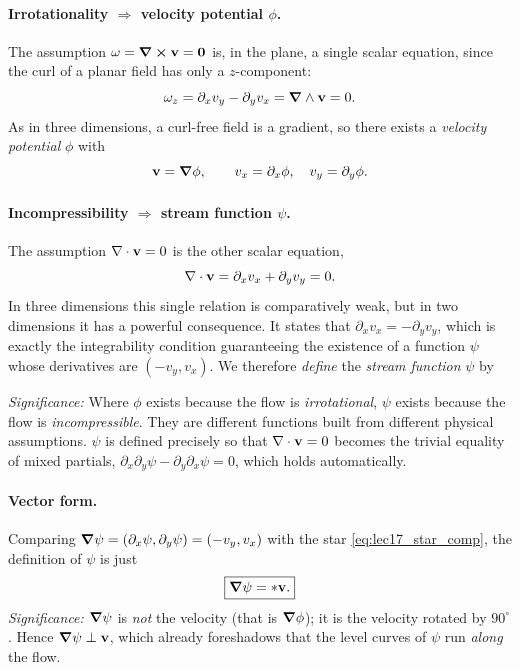 \documentclass[../main.tex]{subfiles}
\begin{document}
\paragraph{Irrotationality $\Rightarrow$ velocity potential $\phi$.}
The assumption $\mathbf{\omega}=\curl\mathbf{v}=\mathbf{0}$ is, in the plane, a single scalar equation, since the curl of a planar field has only a $z$-component:
\begin{equation}
  \omega_z=\partial_x v_y-\partial_y v_x = \grad\wedge\mathbf{v} = 0.
  \label{eq:lec17_irrot}
\end{equation}
As in three dimensions, a curl-free field is a gradient, so there exists a \emph{velocity potential} $\phi$ with
\begin{equation}
  \mathbf{v}=\grad\phi,\qquad v_x=\partial_x\phi,\quad v_y=\partial_y\phi.
  \label{eq:lec17_velpot}
\end{equation}

\paragraph{Incompressibility $\Rightarrow$ stream function $\psi$.}
The assumption $\nabla \cdot\mathbf{v}=0$ is the other scalar equation,
\begin{equation}
  \nabla \cdot\mathbf{v} = \partial_x v_x+\partial_y v_y = 0.
  \label{eq:lec17_incomp}
\end{equation}
In three dimensions this single relation is comparatively weak, but in two dimensions it has a powerful consequence. It states that $\partial_x v_x=-\partial_y v_y$, which is exactly the integrability condition guaranteeing the existence of a function $\psi$ whose derivatives are $(-v_y,v_x)$. We therefore \emph{define} the \emph{stream function} $\psi$ by

\textit{Significance:} Where $\phi$ exists because the flow is \emph{irrotational}, $\psi$ exists because the flow is \emph{incompressible}. They are different functions built from different physical assumptions. $\psi$ is defined precisely so that $\nabla \cdot\mathbf{v}=0$ becomes the trivial equality of mixed partials, $\partial_x\partial_y\psi-\partial_y\partial_x\psi=0$, which holds automatically.

\paragraph{Vector form.} Comparing $\grad\psi=(\partial_x\psi,\partial_y\psi)=(-v_y,v_x)$ with the star \eqref{eq:lec17_star_comp}, the definition of $\psi$ is just
\begin{equation}
  \boxed{\grad\psi = \ast\mathbf{v}.}
  \label{eq:lec17_gradpsi_starv}
\end{equation}
\textit{Significance:} $\grad\psi$ is \emph{not} the velocity (that is $\grad\phi$); it is the velocity rotated by $90^\circ$. Hence $\grad\psi\perp\mathbf{v}$, which already foreshadows that the level curves of $\psi$ run \emph{along} the flow.
\end{document}
